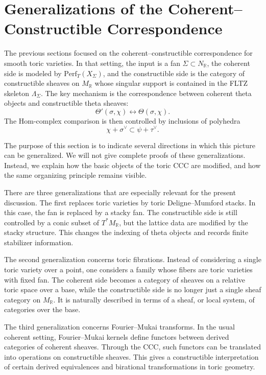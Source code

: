 \section{Generalizations of the Coherent--Constructible Correspondence}

The previous sections focused on the coherent--constructible correspondence for
smooth toric varieties. In that setting, the input is a fan
\(\Sigma\subset N_{\mathbb R}\), the coherent side is modeled by
\(\mathrm{Perf}_T(X_\Sigma)\), and the constructible side is the category of
constructible sheaves on \(M_{\mathbb R}\) whose singular support is contained
in the FLTZ skeleton \(\Lambda_\Sigma\). The key mechanism is the correspondence
between coherent theta objects and constructible theta sheaves:
\[
\Theta'(\sigma,\chi)
\longleftrightarrow
\Theta(\sigma,\chi).
\]
The Hom-complex comparison is then controlled by inclusions of polyhedra
\[
\chi+\sigma^\vee\subset \psi+\tau^\vee.
\]

The purpose of this section is to indicate several directions in which this
picture can be generalized. We will not give complete proofs of these
generalizations. Instead, we explain how the basic objects of the toric CCC are
modified, and how the same organizing principle remains visible.

There are three generalizations that are especially relevant for the present
discussion. The first replaces toric varieties by toric Deligne--Mumford stacks.
In this case, the fan is replaced by a stacky fan. The constructible side is
still controlled by a conic subset of \(T^*M_{\mathbb R}\), but the lattice data
are modified by the stacky structure. This changes the indexing of theta
objects and records finite stabilizer information.

The second generalization concerns toric fibrations. Instead of considering a
single toric variety over a point, one considers a family whose fibers are
toric varieties with fixed fan. The coherent side becomes a category of sheaves
on a relative toric space over a base, while the constructible side is no
longer just a single sheaf category on \(M_{\mathbb R}\). It is naturally
described in terms of a sheaf, or local system, of categories over the base.

The third generalization concerns Fourier--Mukai transforms. In the usual
coherent setting, Fourier--Mukai kernels define functors between derived
categories of coherent sheaves. Through the CCC, such functors can be translated
into operations on constructible sheaves. This gives a constructible
interpretation of certain derived equivalences and birational transformations
in toric geometry.

